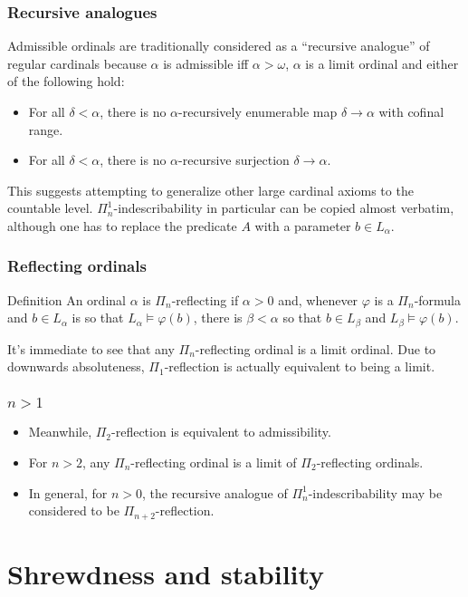 \documentclass{beamer}
\begin{document}
\begin{frame}
\frametitle{Recursive analogues}
Admissible ordinals are traditionally considered as a ``recursive analogue'' of regular cardinals because $\alpha$ is admissible iff $\alpha > \omega$, $\alpha$ is a limit ordinal and either of the following hold:

\begin{itemize}
    \item For all $\delta < \alpha$, there is no $\alpha$-recursively enumerable map $\delta \to \alpha$ with cofinal range.
    \item For all $\delta < \alpha$, there is no $\alpha$-recursive surjection $\delta \to \alpha$.
\end{itemize}

This suggests attempting to generalize other large cardinal axioms to the countable level. $\Pi^1_n$-indescribability in particular can be copied almost verbatim, although one has to replace the predicate $A$ with a parameter $b \in L_\alpha$.
\end{frame}

\begin{frame}
\frametitle{Reflecting ordinals}
\begin{block}{Definition}
An ordinal $\alpha$ is $\Pi_n$-reflecting if $\alpha > 0$ and, whenever $\varphi$ is a $\Pi_n$-formula and $b \in L_\alpha$ is so that $L_\alpha \models \varphi(b)$, there is $\beta < \alpha$ so that $b \in L_\beta$ and $L_\beta \models \varphi(b)$.
\end{block}

It's immediate to see that any $\Pi_n$-reflecting ordinal is a limit ordinal. Due to downwards absoluteness, $\Pi_1$-reflection is actually equivalent to being a limit.
\end{frame}

\begin{frame}
\frametitle{$n > 1$}
\begin{itemize}
    \item Meanwhile, $\Pi_2$-reflection is equivalent to admissibility.
    \item For $n > 2$, any $\Pi_n$-reflecting ordinal is a limit of $\Pi_2$-reflecting ordinals.
    \item In general, for $n > 0$, the recursive analogue of $\Pi^1_n$-indescribability may be considered to be $\Pi_{n+2}$-reflection.
\end{itemize}
\end{frame}

\section{Shrewdness and stability}
\end{document}
